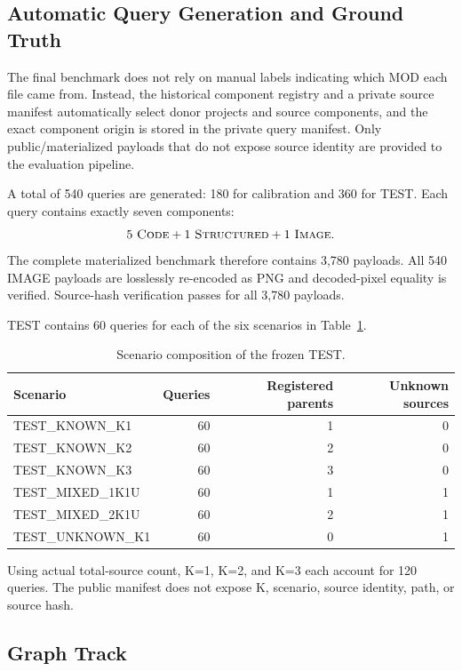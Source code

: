 \documentclass[runningheads]{llncs}
\begin{document}
\subsection{Automatic Query Generation and Ground Truth}

The final benchmark does not rely on manual labels indicating which MOD each file came from. Instead, the historical component registry and a private source manifest automatically select donor projects and source components, and the exact component origin is stored in the private query manifest. Only public/materialized payloads that do not expose source identity are provided to the evaluation pipeline.

A total of 540 queries are generated: 180 for calibration and 360 for TEST. Each query contains exactly seven components:
\[
5\ \textsc{Code}
+
1\ \textsc{Structured}
+
1\ \textsc{Image}.
\]
The complete materialized benchmark therefore contains 3,780 payloads. All 540 IMAGE payloads are losslessly re-encoded as PNG and decoded-pixel equality is verified. Source-hash verification passes for all 3,780 payloads.

TEST contains 60 queries for each of the six scenarios in Table~\ref{tab:scenario}.

\begin{table}[!htbp]
\centering
\caption{Scenario composition of the frozen TEST.}
\label{tab:scenario}
\scriptsize
\begin{tabular}{lrrr}
\toprule
Scenario & Queries & Registered parents & Unknown sources\\
\midrule
TEST\_KNOWN\_K1 & 60 & 1 & 0\\
TEST\_KNOWN\_K2 & 60 & 2 & 0\\
TEST\_KNOWN\_K3 & 60 & 3 & 0\\
TEST\_MIXED\_1K1U & 60 & 1 & 1\\
TEST\_MIXED\_2K1U & 60 & 2 & 1\\
TEST\_UNKNOWN\_K1 & 60 & 0 & 1\\
\bottomrule
\end{tabular}
\end{table}

Using actual total-source count, K=1, K=2, and K=3 each account for 120 queries. The public manifest does not expose K, scenario, source identity, path, or source hash.

\subsection{Graph Track}
\end{document}
